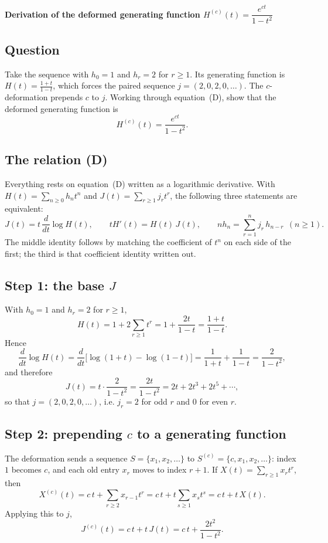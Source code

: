 \documentclass[11pt]{article}
\begin{document}
\begin{center}
  \textbf{\large Derivation of the deformed generating function
  $H^{(c)}(t)=\dfrac{e^{ct}}{1-t^2}$}
\end{center}

\subsection*{Question}

Take the sequence with $h_0 = 1$ and $h_r = 2$ for $r \ge 1$.  Its generating
function is $H(t) = \frac{1+t}{1-t}$, which forces the paired sequence
$j = (2,0,2,0,\dots)$.  The $c$-deformation prepends $c$ to $j$.  Working
through equation~(D), show that the deformed generating function is
\[
  H^{(c)}(t) = \frac{e^{ct}}{1-t^2}.
\]

\subsection*{The relation (D)}

Everything rests on equation~(D) written as a logarithmic derivative.  With
$H(t) = \sum_{n\ge 0} h_n t^n$ and $J(t) = \sum_{r\ge 1} j_r t^r$, the
following three statements are equivalent:
\[
  J(t) = t\,\frac{d}{dt}\log H(t),
  \qquad
  t H'(t) = H(t)\,J(t),
  \qquad
  n h_n = \sum_{r=1}^{n} j_r\, h_{n-r}\ \ (n \ge 1).
\]
The middle identity follows by matching the coefficient of $t^n$ on each
side of the first; the third is that coefficient identity written out.

\subsection*{Step 1: the base $J$}

With $h_0 = 1$ and $h_r = 2$ for $r \ge 1$,
\[
  H(t) = 1 + 2\sum_{r\ge 1} t^r = 1 + \frac{2t}{1-t} = \frac{1+t}{1-t}.
\]
Hence
\[
  \frac{d}{dt}\log H(t)
    = \frac{d}{dt}\bigl[\log(1+t) - \log(1-t)\bigr]
    = \frac{1}{1+t} + \frac{1}{1-t}
    = \frac{2}{1-t^2},
\]
and therefore
\[
  J(t) = t\cdot\frac{2}{1-t^2}
       = \frac{2t}{1-t^2}
       = 2t + 2t^3 + 2t^5 + \cdots,
\]
so that $j = (2,0,2,0,\dots)$, i.e. $j_r = 2$ for odd $r$ and $0$ for even $r$.

\subsection*{Step 2: prepending $c$ to a generating function}

The deformation sends a sequence $S = \{x_1, x_2, \dots\}$ to
$S^{(c)} = \{c, x_1, x_2, \dots\}$: index $1$ becomes $c$, and each old entry
$x_r$ moves to index $r+1$.  If $X(t) = \sum_{r\ge 1} x_r t^r$, then
\[
  X^{(c)}(t)
    = c\,t + \sum_{r\ge 2} x_{r-1} t^{r}
    = c\,t + t\sum_{s\ge 1} x_s t^{s}
    = c\,t + t\,X(t).
\]
Applying this to $j$,
\[
  J^{(c)}(t) = c\,t + t\,J(t)
             = c\,t + \frac{2t^2}{1-t^2}.
\]
\end{document}
